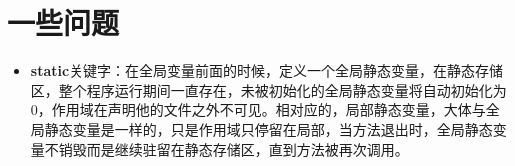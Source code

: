 \section{一些问题}
\begin{itemize}
\item \textbf{static}关键字：在全局变量前面的时候，定义一个全局静态变量，在静态存储区，整个程序运行期间一直存在，未被初始化的全局静态变量将自动初始化为0，作用域在声明他的文件之外不可见。相对应的，局部静态变量，大体与全局静态变量是一样的，只是作用域只停留在局部，当方法退出时，全局静态变量不销毁而是继续驻留在静态存储区，直到方法被再次调用。
\end{itemize}
